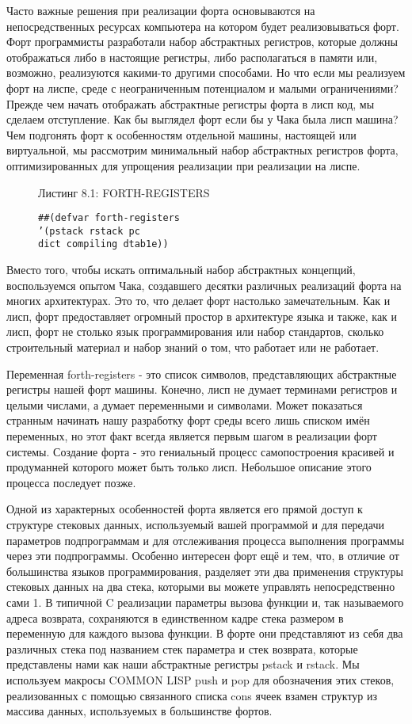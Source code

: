Часто важные решения при реализации форта основываются на непосредственных ресурсах компьютера на котором будет реализовываться форт. Форт программисты разработали набор абстрактных регистров, которые должны отображаться либо в настоящие регистры, либо располагаться в памяти или, возможно, реализуются какими-то другими способами. Но что если мы реализуем форт на лиспе, среде с неограниченным потенциалом и малыми ограничениями? Прежде чем начать отображать абстрактные регистры форта в лисп код, мы сделаем отступление. Как бы выглядел форт если бы у Чака была лисп машина? Чем подгонять форт к особенностям отдельной машины, настоящей или виртуальной, мы рассмотрим минимальный набор абстрактных регистров форта, оптимизированных для упрощения реализации при реализации на лиспе.

\begin{figure}Листинг 8.1: FORTH-REGISTERS\label{listing_8.1}
  \listbegin
  \begin{verbatim}
##(defvar forth-registers
’(pstack rstack pc
dict compiling dtab1e)) 
\end{verbatim}
  \listend
\end{figure}

Вместо того, чтобы искать оптимальный набор абстрактных концепций, воспользуемся опытом Чака, создавшего десятки различных реализаций форта на многих архитектурах. Это то, что делает форт настолько замечательным. Как и лисп, форт предоставляет огромный простор в архитектуре языка и также, как и лисп, форт не столько язык программирования или набор стандартов, сколько строительный материал и набор знаний о том, что работает или не работает.

Переменная forth-registers - это список символов, представляющих абстрактные регистры нашей форт машины. Конечно, лисп не думает терминами регистров и целыми числами, а думает переменными и символами. Может показаться странным начинать нашу разработку форт среды всего лишь списком имён переменных, но этот факт всегда является первым шагом в реализации форт системы. Создание форта - это гениальный процесс самопостроения красивей и продуманней которого может быть только лисп. Небольшое описание этого процесса последует позже.

Одной из характерных особенностей форта является его прямой доступ к структуре стековых данных, используемый вашей программой и для передачи параметров подпрограммам и для отслеживания процесса выполнения программы через эти подпрограммы. Особенно интересен форт ещё и тем, что, в отличие от большинства языков программирования, разделяет эти два применения структуры стековых данных на два стека, которыми вы можете управлять непосредственно сами 1. В типичной C реализации параметры вызова функции и, так называемого адреса возврата, сохраняются в единственном кадре стека размером в переменную для каждого вызова функции. В форте они представляют из себя два различных стека под названием стек параметра и стек возврата, которые представлены нами как наши абстрактные регистры pstack и rstack. Мы используем макросы COMMON LISP push и pop для обозначения этих стеков, реализованных с помощью связанного списка cons ячеек взамен структур из массива данных, используемых в большинстве фортов.

